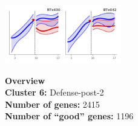 \begin{multicols}{2}
\includegraphics[width=2in]{figures/clusters/leaf_Postflowering_5.png}
\columnbreak

\noindent \textbf{Overview}\\\textbf{Cluster 6:} Defense-post-2 \\
\textbf{Number of genes:} 2415 \\
\textbf{Number of ``good'' genes:} 1196 \\
\end{multicols}

